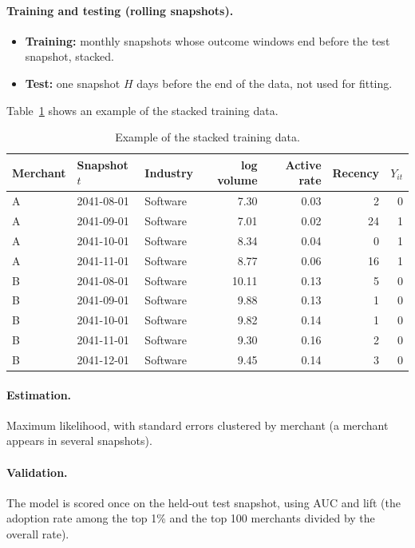 \documentclass[11pt]{article}
\begin{document}
\paragraph{Training and testing (rolling snapshots).}
\begin{itemize}
  \item \textbf{Training:} monthly snapshots whose outcome windows end before the test snapshot, stacked.
  \item \textbf{Test:} one snapshot $H$ days before the end of the data, not used for fitting.
\end{itemize}
Table~\ref{tab:example} shows an example of the stacked training data.

\begin{table}[H]
\centering
\caption{Example of the stacked training data.}
\label{tab:example}
\begin{tabular}{lllrrrr}
\toprule
Merchant & Snapshot $t$ & Industry & log volume & Active rate & Recency & $Y_{it}$ \\
\midrule
A & 2041-08-01 & Software & 7.30 & 0.03 & 2 & 0 \\
A & 2041-09-01 & Software & 7.01 & 0.02 & 24 & 1 \\
A & 2041-10-01 & Software & 8.34 & 0.04 & 0 & 1 \\
A & 2041-11-01 & Software & 8.77 & 0.06 & 16 & 1 \\
B & 2041-08-01 & Software & 10.11 & 0.13 & 5 & 0 \\
B & 2041-09-01 & Software & 9.88 & 0.13 & 1 & 0 \\
B & 2041-10-01 & Software & 9.82 & 0.14 & 1 & 0 \\
B & 2041-11-01 & Software & 9.30 & 0.16 & 2 & 0 \\
B & 2041-12-01 & Software & 9.45 & 0.14 & 3 & 0 \\
\bottomrule
\end{tabular}
\end{table}

\paragraph{Estimation.} Maximum likelihood, with standard errors clustered by merchant (a merchant appears in several snapshots).

\paragraph{Validation.} The model is scored once on the held-out test snapshot, using AUC and lift (the adoption rate among the top 1\% and the top 100 merchants divided by the overall rate).
\end{document}
